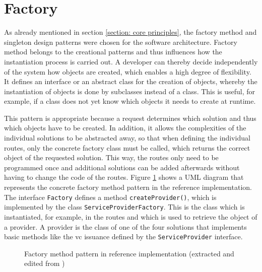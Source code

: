        
    \section{Factory}
    
    As already mentioned in section \ref{section: core principles}, the factory method and singleton design patterns were chosen for the software architecture. Factory method belongs to the creational patterns and thus influences how the instantiation process is carried out. A developer can thereby decide independently of the system how objects are created, which enables a high degree of flexibility. It defines an interface or an abstract class for the creation of objects, whereby the instantiation of objects is done by subclasses instead of a class. This is useful, for example, if a class does not yet know which objects it needs to create at runtime. \cite[pp. 81, 85, 107-108]{gamma_design_1995} 
    
    This pattern is appropriate because a request determines which solution and thus which objects have to be created. In addition, it allows the complexities of the individual solutions to be abstracted away, so that when defining the individual routes, only the concrete factory class must be called, which returns the correct object of the requested solution. This way, the routes only need to be programmed once and additional solutions can be added afterwards without having to change the code of the routes. Figure \ref{figure: factory method} shows a UML diagram that represents the concrete factory method pattern in the reference implementation. The interface \texttt{Factory} defines a method \texttt{createProvider()}, which is implemented by the class \texttt{ServiceProviderFactory}. This is the class which is instantiated, for example, in the routes and which is used to retrieve the object of a provider. A provider is the class of one of the four solutions that implements basic methods like the \ac{vc} issuance defined by the \texttt{ServiceProvider} interface.
    
    \begin{figure}[ht]
	    \centering    	    \makebox[\textwidth]{}
        \caption{Factory method pattern in reference implementation (extracted and edited from \cite[p. 107]{gamma_design_1995})}
        \label{figure: factory method}
    \end{figure}
    
